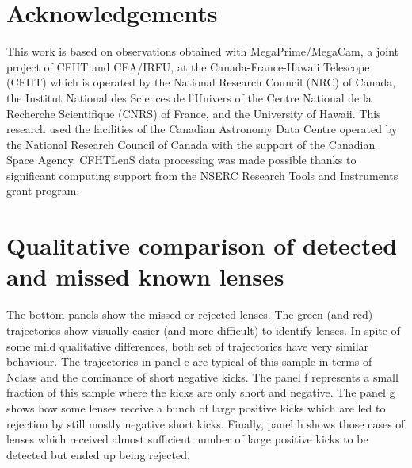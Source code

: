 \documentclass[useAMS,usenatbib,a4paper]{mn2e}
\begin{document}
\twocolumn
\section*{Acknowledgements}


This work is based on observations obtained with MegaPrime/MegaCam, a joint
project of CFHT and CEA/IRFU, at the Canada-France-Hawaii Telescope (CFHT) which
is operated by the National Research Council (NRC) of Canada, the Institut
National des Sciences de l'Univers of the Centre National de la Recherche
Scientifique (CNRS) of France, and the University of Hawaii. This research used
the facilities of the Canadian Astronomy Data Centre operated by the National
Research Council of Canada with the support of the Canadian Space Agency.
CFHTLenS data processing was made possible thanks to significant computing
support from the NSERC Research Tools and Instruments grant program.


\appendix

\section{Qualitative comparison of detected and missed known lenses}
\label{appendix:traj}

The bottom panels show the missed or rejected lenses. The green (and red)
trajectories show visually easier (and more difficult) to identify
lenses. In spite of some mild qualitative differences, both set of
trajectories have very similar behaviour. The trajectories in panel e
are typical of this sample in terms of Nclass and the dominance of short
negative kicks. The panel f represents a small fraction of this sample
where the kicks are only short and negative. The panel g shows how some
lenses receive a bunch of large positive kicks which are led to
rejection by still mostly negative short kicks. Finally, panel h shows
those cases of lenses which received almost sufficient number of large
positive kicks to be detected but ended up being rejected.
\end{document}
